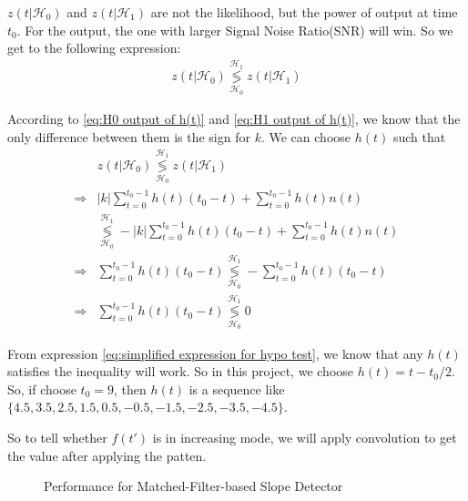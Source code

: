 \documentclass[journal]{IEEEtran}
\begin{document}
$z(t | \mathcal{H}_0)$ and $z(t | \mathcal{H}_1)$ are not the likelihood, but the power of output at time $t_0$. For the output, the one with larger Signal Noise Ratio(SNR) will win. So we get to the following expression:
\begin{align}
	z(t | \mathcal{H}_0) \mathop{\lessgtr}\limits_{\mathcal{H}_0}^{\mathcal{H}_1} z(t | \mathcal{H}_1)
\end{align}

According to \ref{eq:H0 output of h(t)} and \ref{eq:H1 output of h(t)}, we know that the only difference between them is the sign for $k$. We can choose $h(t)$ such that 
\begin{align}
		& z(t | \mathcal{H}_0) \mathop{\lessgtr}\limits_{\mathcal{H}_0}^{\mathcal{H}_1} z(t | \mathcal{H}_1) \\
	\Rightarrow &
		|k|\sum_{t = 0} ^ {t_0 - 1} h(t)(t_0 - t) + \sum_{t = 0} ^ {t_0 - 1} h(t) n(t) \nonumber\\
	& \mathop{\lessgtr}\limits_{\mathcal{H}_0}^{\mathcal{H}_1} -|k|\sum_{t = 0} ^ {t_0 - 1} h(t)(t_0 - t) + \sum_{t = 0} ^ {t_0 - 1} h(t) n(t) \\
	\Rightarrow &
		\sum_{t = 0} ^ {t_0 - 1} h(t)(t_0 - t) \mathop{\lessgtr}\limits_{\mathcal{H}_0}^{\mathcal{H}_1} -\sum_{t = 0} ^ {t_0 - 1} h(t)(t_0 - t) \\
	\Rightarrow &
		\sum_{t = 0} ^ {t_0 - 1} h(t)(t_0 - t) \mathop{\lessgtr}\limits_{\mathcal{H}_0}^{\mathcal{H}_1} 0
	\label{eq:simplified expression for hypo test}
\end{align}

From expression \ref{eq:simplified expression for hypo test}, we know that any $h(t)$ satisfies the inequality will work. So in this project, we choose $h(t) = t - t_0/2$. So, if choose $t_0 = 9$, then $h(t)$ is a sequence like $\{4.5, 3.5, 2.5, 1.5, 0.5, -0.5, -1.5, -2.5, -3.5, -4.5\}$.

So to tell whether $f(t')$ is in increasing mode, we will apply convolution to get the value after applying the patten.
\begin{figure}[ht]
\centering
{}
\quad
{}
\caption{Performance for Matched-Filter-based Slope Detector}
\label{fig:Performance for Matched-Filter-based Slope Detector}
\end{figure}
\end{document}
